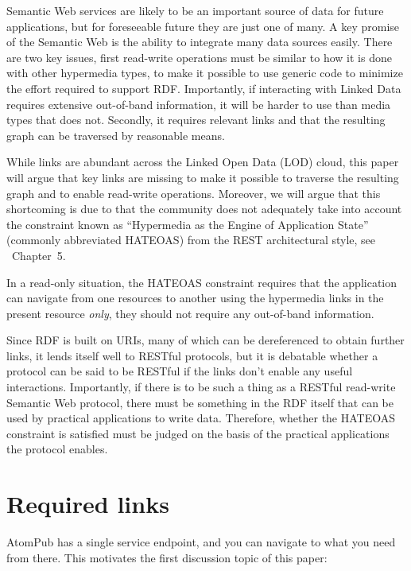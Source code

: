 \documentclass{llncs}
\begin{document}
Semantic Web services are likely to be an important source of data for
future applications, but for foreseeable future they are just one of many. A
key promise of the Semantic Web is the ability to integrate many data
sources easily. There are two key issues, first read-write operations
must be similar to how it is done with other hypermedia types, to make
it possible to use generic code to minimize the effort required to
support RDF. Importantly, if interacting with Linked Data requires
extensive out-of-band information, it will be harder to use than media
types that does not. Secondly, it requires relevant links and that the
resulting graph can be traversed by reasonable means.

While links are abundant across the Linked Open Data (LOD) cloud, this paper will
argue that key links are missing to make it possible to traverse the
resulting graph and to enable read-write operations. Moreover, we will
argue that this shortcoming is due to that the community does not
adequately take into account the constraint known as ``Hypermedia as
the Engine of Application State'' (commonly abbreviated HATEOAS) from
the REST architectural style, see
\cite{Fielding_2000_Architectural-Styles}~Chapter~5.

In a read-only situation, the HATEOAS constraint requires that the
application can navigate from one resources to another using the
hypermedia links in the present resource \emph{only}, they should not
require any out-of-band information.

Since RDF is built on URIs, many of which can be dereferenced to
obtain further links, it lends itself well to RESTful protocols, but
it is debatable whether a protocol can be said to be RESTful if the
links don't enable any useful interactions. Importantly, if there is
to be such a thing as a RESTful read-write Semantic Web protocol,
there must be something in the RDF itself that can be used by
practical applications to write data. Therefore, whether the HATEOAS
constraint is satisfied must be judged on the basis of the practical
applications the protocol enables.

\section{Required links}

AtomPub has a single service endpoint,
and you can navigate to what you need from there. This motivates the
first discussion topic of this paper:
\end{document}

